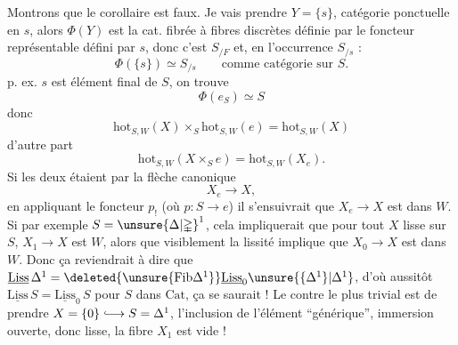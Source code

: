 Montrons que le corollaire est faux. Je vais prendre $Y=\{s\}$, catégorie ponctuelle en $s$,  alors $\Phi(Y)$ est la cat. fibrée à fibres discrètes définie par le foncteur représentable  défini par $s$, donc c'est $S_{/F}$ et, en l'occurrence $S_{/s}$ :
\[
 \Phi(\{s\})\simeq S_{/s}\qquad\text{comme catégorie sur }S.
\]
 p. ex. $s$ est élément final  de $S$, on trouve
\[
 \Phi(e_S)\simeq S
\]
donc
\[
 \mathrm{hot}_{S,W}(X)\times_S\mathrm{hot}_{S,W}(e)=\mathrm{hot}_{S,W}(X)
\]
d'autre part
\[
 \mathrm{hot}_{S,W}(X\times_S e)=\mathrm{hot}_{S,W}(X_e).
\]
Si les deux étaient   par la flèche canonique
\[
 X_e\longrightarrow X,
\]
en appliquant le foncteur $p_!$ (où $p:S\longrightarrow e$) il s'ensuivrait que $X_e\longrightarrow X$ est dans $W$. Si par exemple $S=\unsure{\Delta|\mathbb{\Delta}}^1$, cela impliquerait que pour tout $X$ lisse sur $S$, $X_1\longrightarrow X$ est  $W$, alors que visiblement la lissité implique que $X_0\longrightarrow X$ est dans $W$.  Donc ça reviendrait à dire que  $\underline{\mathrm{Liss}}\,\Delta^1=\deleted{\unsure{\mathrm{Fib}\Delta^1}}\underline{\mathrm{Liss}}_0\unsure{\{\Delta^1\}|\Delta^1}$, d'où aussitôt $\underline{\mathrm{Liss}}\,S=\underline{\mathrm{Liss}}_0\,S$  pour  $S$ dans $\mathrm{Cat}$, ça se saurait ! Le contre  le plus trivial est de prendre $X=\{0\}\lhook\joinrel\longrightarrow S=\Delta^1$, l'inclusion de l'élément ``générique'', immersion ouverte, donc lisse, la fibre  $X_1$ est vide !

